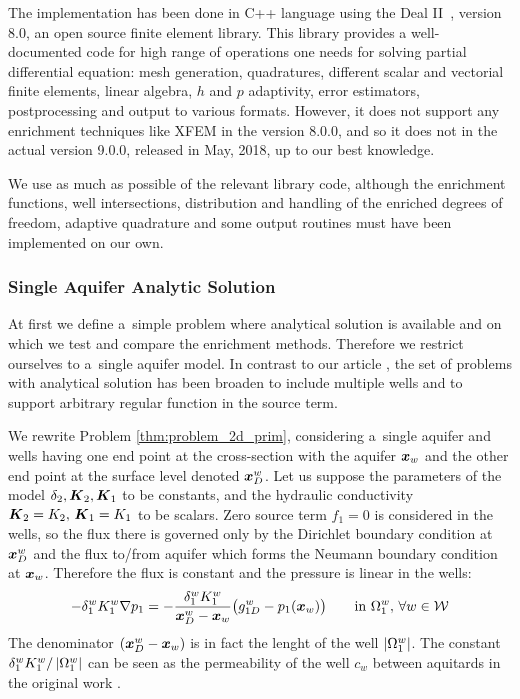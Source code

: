 The implementation has been done in C++ language using the Deal II~\cite{bangerth_deal.ii_2007}, version 8.0, 
an open source finite element library. This library provides a well-documented code for high range of operations one needs
for solving partial differential equation: mesh generation, quadratures, different scalar and vectorial finite elements,
linear algebra, $h$ and $p$ adaptivity, error estimators, postprocessing and output to various formats.
However, it does not support any enrichment techniques like XFEM in the version 8.0.0,
and so it does not in the actual version 9.0.0, released in May, 2018, up to our best knowledge.

We use as much as possible of the relevant library code, although the enrichment functions, well intersections,
distribution and handling of the enriched degrees of freedom, adaptive quadrature and some output routines
must have been implemented on our own.

\subsubsection{Single Aquifer Analytic Solution} \label{sec:prim_analytic_solution}
At first we define a~simple problem where analytical solution is available and 
on which we test and compare the enrichment methods.
Therefore we restrict ourselves to a~single aquifer model.
In contrast to our article \cite{exner_2016}, the set of problems with analytical solution 
has been broaden to include multiple wells and to support arbitrary regular function in the source term.

We rewrite Problem \ref{thm:problem_2d_prim}, considering a~single aquifer and wells having one end point
at the cross-section with the aquifer $\mathbf{\boldsymbol{x}}_w$ and the other end point at the surface level denoted $\mathbf{\boldsymbol{x}}^w_D$.
Let us suppose the parameters of the model $\delta_2, \mathbf{\boldsymbol{K}}_2, \mathbf{\boldsymbol{K}}_1$ to be constants, and
the hydraulic conductivity $\mathbf{\boldsymbol{K}}_2 = K_2,\, \mathbf{\boldsymbol{K}}_1 = K_1$ to be scalars.
Zero source term $f_1=0$ is considered in the wells, so the flux there is governed only by the Dirichlet
boundary condition at $\mathbf{\boldsymbol{x}}^w_D$ and the flux to/from aquifer which forms the Neumann boundary condition at $\mathbf{\boldsymbol{x}}_w$.
Therefore the flux is constant and the pressure is linear in the wells:
\begin{equation} \label{eqn:linear_pressure_in_1d}
    -\delta^w_1 K^w_1 \nabla p_1 = -\frac{\delta^w_1 K^w_1}{\mathbf{\boldsymbol{x}}^w_D-\mathbf{\boldsymbol{x}}_w} \big( g^w_{1D} - p_1(\mathbf{\boldsymbol{x}}_w) \big) \qquad \textrm{in } \Omega^w_1,\,\forall w\in\mathcal{W}
\end{equation}
The denominator $(\mathbf{\boldsymbol{x}}^w_D-\mathbf{\boldsymbol{x}}_w)$ is in fact the lenght of the well $\left|\Omega^w_1\right|$.
The constant ${\delta^w_1 K^w_1}/\left|\Omega^w_1\right|$ can be seen as the permeability of the well $c_w$ between aquitards
in the original work \cite{exner_2016}.

